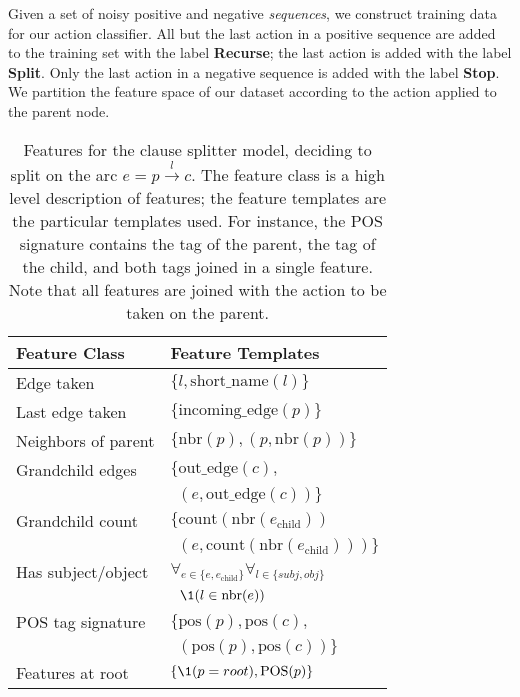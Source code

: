 
Given a set of noisy positive and negative \textit{sequences}, we construct 
  training data for our action classifier.
All but the last action in a positive sequence are added to the training set
  with the label \textbf{Recurse}; the last action is added with the label
  \textbf{Split}.
Only the last action in a negative sequence is added with the label \textbf{Stop}.
We partition the feature space of our dataset according to the action
  applied to the parent node.

%
%

\begin{table}
\begin{tabular}{ll}
  \textbf{Feature Class} & \textbf{Feature Templates} \\
  \hline
  Edge taken          & $\{ l, \textrm{short\_name}(l) \}$ \\
  Last edge taken     & $\{ \textrm{incoming\_edge}(p) \}$ \\
  Neighbors of parent & $\{ \textrm{nbr}(p), (p, \textrm{nbr}(p)) \}$ \\
  Grandchild edges    & $\{ \textrm{out\_edge}(c), $ \\
                      & $~~ (e, \textrm{out\_edge}(c)) \}$ \\
  Grandchild count    & $\{ \textrm{count}\left( \textrm{nbr}(e_\textrm{child}) \right) $ \\
                      & $~~ \left(e, \textrm{count}\left( \textrm{nbr}(e_\textrm{child}) \right) \right) \}$ \\
  Has subject/object  & $\forall_{e \in \{e, e_\textrm{child}\}} \forall_{l \in \{\textit{subj}, \textit{obj}\}} $ \\
                      & $~~ \1(l \in \textrm{nbr}(e)) $ \\
  POS tag signature   & $\{ \textrm{pos}(p), \textrm{pos}(c), $ \\
                      & $~~ \left( \textrm{pos}(p), \textrm{pos}(c) \right) \}$ \\
  Features at root    & $\{ \1(p = root), \textrm{POS}(p) \}$
\end{tabular}
\caption{\label{tab:features}
Features for the clause splitter model, deciding to split on the arc
  $e = p \xrightarrow{l} c$.
The feature class is a high level description of features; the feature
  templates are the particular templates used.
For instance, the POS signature contains the tag of the parent, the tag of
  the child, and both tags joined in a single feature.
Note that all features are joined with the action to be taken on the parent.
}
\end{table}


